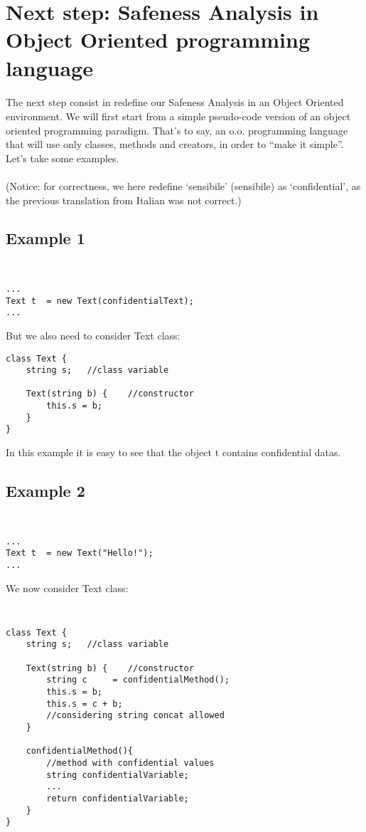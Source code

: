 \documentclass[letterpaper,twocolumn,10pt]{article}
\begin{document}

\section{Next step: Safeness Analysis in Object Oriented programming language}
\paragraph{}
The next step consist in redefine our Safeness Analysis in an Object Oriented environment. We will first start from a simple pseudo-code version of an object oriented programming paradigm. That's to say, an o.o. programming language that will use only classes, methods and creators, in order to ``make it simple''. Let's take some examples.\\ \\
(Notice: for correctness, we here redefine `sensibile' (sensibile) as `confidential', as the previous translation from Italian was not correct.)\\

\subsection{Example 1}
{\tt \small
\begin{verbatim}
...
Text t	= new Text(confidentialText);
...
\end{verbatim}
}
But we also need to consider Text class: \\

\begin{verbatim}
class Text {
    string s;	//class variable
	
    Text(string b) { 	//constructor
        this.s = b;
    }
}
\end{verbatim}

In this example it is easy to see that the object t contains confidential datas.\\

\subsection{Example 2}
{\tt \small
\begin{verbatim}
...
Text t	= new Text("Hello!");
...
\end{verbatim}
}
We now consider Text class: \\
{\tt \small
\begin{verbatim}
class Text {
    string s;	//class variable
	
    Text(string b) { 	//constructor
        string c	 = confidentialMethod();
        this.s = b;
        this.s = c + b;
        //considering string concat allowed
    }
	
    confidentialMethod(){ 
        //method with confidential values
        string confidentialVariable;		
        ...
        return confidentialVariable;
    }
}
\end{verbatim}
}
\end{document}
